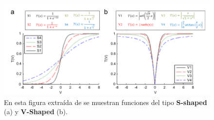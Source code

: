 \begin{figure}[H]
  \begin{center}
    \includegraphics[width=1\textwidth]{imagenes/transfer_functions.png}
  \end{center}
  \caption[Funciones de transferencia]{En esta figura extraída de \cite{mirjalili_s-shaped_2013} se muestran funciones del tipo \textbf{S-shaped} (a) y \textbf{V-Shaped} (b).}
\end{figure}